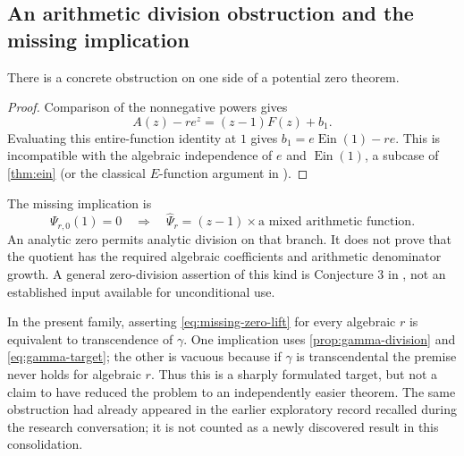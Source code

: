 \documentclass[11pt,a4paper]{article}
\numberwithin{equation}{section}
\newtheorem{proposition}[theorem]{Proposition}
\theoremstyle{definition}
\theoremstyle{remark}
\newcommand{\Ein}{\operatorname{Ein}}
\begin{document}
\subsection{An arithmetic division obstruction and the missing implication}
There is a concrete obstruction on one side of a potential zero theorem.

\begin{proof}
Comparison of the nonnegative powers gives
\[
 A(z)-r e^z=(z-1)F(z)+b_1.
\]
Evaluating this entire-function identity at $1$ gives
$b_1=e\Ein(1)-re$. This is incompatible with the algebraic independence
of $e$ and $\Ein(1)$, a subcase of \cref{thm:ein} (or the classical
$E$-function argument in \cite{RivoalSurvey}).
\end{proof}
The missing implication is
\begin{equation}\label{eq:missing-zero-lift}
 \Psi_{r,0}(1)=0
 \quad\Longrightarrow\quad
 \widehat\Psi_r=(z-1)\times\text{a mixed arithmetic function}.
\end{equation}
An analytic zero permits analytic division on that branch. It does not
prove that the quotient has the required algebraic coefficients and
arithmetic denominator growth. A general zero-division assertion of this
kind is Conjecture 3 in \cite{FischlerRivoalGevrey}, not an established
input available for unconditional use.

In the present family, asserting \eqref{eq:missing-zero-lift} for every
algebraic $r$ is equivalent to transcendence of $\gamma$. One implication
uses \cref{prop:gamma-division} and \eqref{eq:gamma-target}; the other is
vacuous because if $\gamma$ is transcendental the premise never holds
for algebraic $r$. Thus this is a sharply formulated target, but not a
claim to have reduced the problem to an independently easier theorem.
The same obstruction had already appeared in the earlier exploratory
record recalled during the research conversation; it is not counted as
a newly discovered result in this consolidation.
\end{document}
